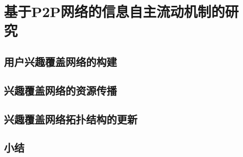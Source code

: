 \section{基于P2P网络的信息自主流动机制的研究}
\subsection{用户兴趣覆盖网络的构建}
\subsection{兴趣覆盖网络的资源传播}
\subsection{兴趣覆盖网络拓扑结构的更新}
\subsection{小结}
